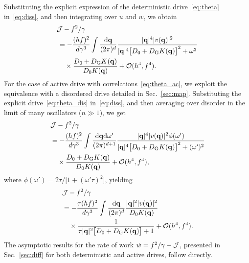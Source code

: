\documentclass[superscriptaddress, twocolumn, prx, longbibliography, nofootinbib]{revtex4-1}
\begin{document}
Substituting the explicit expression of the deterministic drive~\eqref{eq:theta} in~\eqref{eq:diss}, and then integrating over $u$ and $w$, we obtain
\begin{equation}
	\begin{aligned}
		&{\cal J} - f^2/\gamma
		\\
		&\,= - \frac{(hf)^2}{d\gamma^3} \int \frac{{\rm d}{\bf q}}{(2\pi)^d} \frac{|{\bf q}|^4 |v({\bf q})|^2}{|{\bf q}|^4\big[D_0+D_{\rm G}K({\bf q})\big]^2 + \omega^2}
		\\
		&\,\quad\times \frac{D_0+D_{\rm G}K({\bf q})}{D_0K({\bf q})} + {\cal O}(h^4,f^4) .
	\end{aligned}
\end{equation}
For the case of active drive with correlations~\eqref{eq:theta_ac}, we exploit the equivalence with a disordered drive detailed in Sec.~\ref{sec:map}. Substituting the explicit drive~\eqref{eq:theta_dis} in~\eqref{eq:diss}, and then averaging over disorder in the limit of many oscillators ($n\gg1$), we get
\begin{equation}
	\begin{aligned}
		&{\cal J} - f^2/\gamma
		\\
		\,&= - \frac{(hf)^2}{d\gamma^3} \int \frac{{\rm d}{\bf q}{\rm d}\omega'}{(2\pi)^{d+1}} \frac{|{\bf q}|^4 |v({\bf q})|^2 \phi(\omega')}{|{\bf q}|^4\big[D_0+D_{\rm G}K({\bf q})\big]^2 + (\omega')^2}
		\\
		&\quad\times \frac{D_0+D_{\rm G}K({\bf q})}{D_0K({\bf q})} + {\cal O}(h^4,f^4) ,
	\end{aligned}
\end{equation}
where $\phi(\omega') = 2\tau/\big[1+(\omega'\tau)^2\big]$, yielding
\begin{equation}
	\begin{aligned}
		&{\cal J} - f^2/\gamma
		\\
		\,&= - \frac{\tau(hf)^2}{d\gamma^3} \int \frac{{\rm d}{\bf q}}{(2\pi)^d} \frac{|{\bf q}|^2 |v({\bf q})|^2}{D_0 K({\bf q})}
		\\
		&\quad\times \frac{1}{\tau|{\bf q}|^2\big[D_0+D_{\rm G}K({\bf q})\big] + 1} + {\cal O}(h^4,f^4) .
	\end{aligned}
\end{equation}
The asymptotic results for the rate of work $\dot w = f^2/\gamma-{\cal J}$, presented in Sec.~\ref{sec:diff} for both deterministic and active drives, follow directly.
\end{document}
